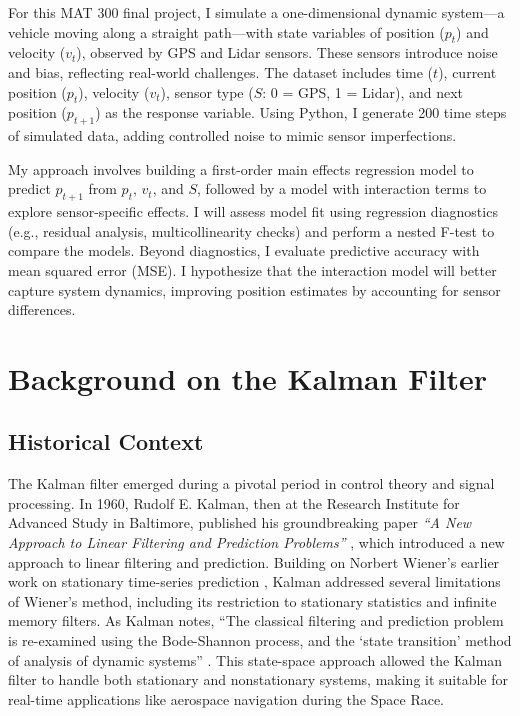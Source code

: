 \documentclass[12pt]{article}
\begin{document}
For this MAT 300 final project, I simulate a one-dimensional dynamic system—a vehicle moving along a straight path—with state variables of position (\( p_t \)) and velocity (\( v_t \)), observed by GPS and Lidar sensors. These sensors introduce noise and bias, reflecting real-world challenges. The dataset includes time (\( t \)), current position (\( p_t \)), velocity (\( v_t \)), sensor type (\( S \): 0 = GPS, 1 = Lidar), and next position (\( p_{t+1} \)) as the response variable. Using Python, I generate 200 time steps of simulated data, adding controlled noise to mimic sensor imperfections.

My approach involves building a first-order main effects regression model to predict \( p_{t+1} \) from \( p_t \), \( v_t \), and \( S \), followed by a model with interaction terms to explore sensor-specific effects. I will assess model fit using regression diagnostics (e.g., residual analysis, multicollinearity checks) and perform a nested F-test to compare the models. Beyond diagnostics, I evaluate predictive accuracy with mean squared error (MSE). I hypothesize that the interaction model will better capture system dynamics, improving position estimates by accounting for sensor differences.


\section{Background on the Kalman Filter}
\label{sec:background}

\subsection{Historical Context}
\label{subsec:historical_context}

The Kalman filter emerged during a pivotal period in control theory and signal processing. In 1960, Rudolf E. Kalman, then at the Research Institute for Advanced Study in Baltimore, published his groundbreaking paper \textit{``A New Approach to Linear Filtering and Prediction Problems''} \cite{kalman1960}, which introduced a new approach to linear filtering and prediction. Building on Norbert Wiener’s earlier work on stationary time-series prediction \cite{wiener1949}, Kalman addressed several limitations of Wiener’s method, including its restriction to stationary statistics and infinite memory filters. As Kalman notes, “The classical filtering and prediction problem is re-examined using the Bode-Shannon process, and the ‘state transition’ method of analysis of dynamic systems” \cite{kalman1960}. This state-space approach allowed the Kalman filter to handle both stationary and nonstationary systems, making it suitable for real-time applications like aerospace navigation during the Space Race.
\end{document}
